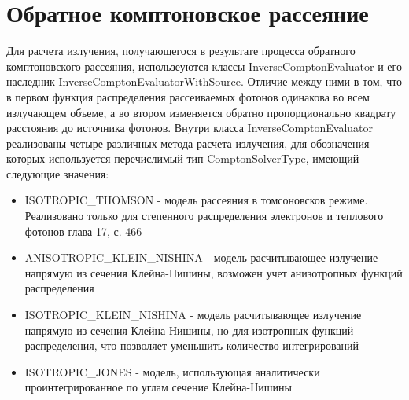 \section{Обратное комптоновское рассеяние}
Для расчета излучения, получающегося в результате процесса обратного комптоновского рассеяния, использеуются классы InverseComptonEvaluator и его наследник InverseComptonEvaluatorWithSource. Отличие между ними в том, что в первом функция распределения рассеиваемых фотонов одинакова во всем излучающем объеме, а во втором изменяется обратно пропорционально квадрату расстояния до источника фотонов. Внутри класса  InverseComptonEvaluator реализованы четыре различных метода расчета излучения, для обозначения которых используется перечислимый тип ComptonSolverType, имеющий следующие значения:

\begin{itemize}
	\item ISOTROPIC\_THOMSON - модель рассеяния в томсоновсков режиме. Реализовано только для степенного распределения электронов и теплового фотонов \cite{Ginzburg1975} глава 17, с. 466
	\item ANISOTROPIC\_KLEIN\_NISHINA - модель расчитывающее излучение напрямую из сечения Клейна-Нишины, возможен учет анизотропных функций распределения \cite{KleinNishina, Dubus}
	\item ISOTROPIC\_KLEIN\_NISHINA - модель расчитывающее излучение напрямую из сечения Клейна-Нишины, но для изотропных функций распределения, что позволяет уменьшить количество интегрирований
	\item ISOTROPIC\_JONES - модель, использующая аналитически проинтегрированное по углам сечение Клейна-Нишины \cite{JonesCompton, BykovUvarov2000}
\end{itemize}


